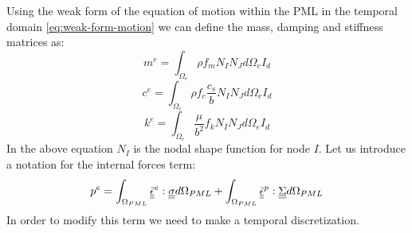 Using the weak form of the equation of motion within the PML in the temporal domain \ref{eq:weak-form-motion} we can define the mass, damping and stiffness matrices as:
\begin{equation}
m^{e} = \int_{\Omega_e} \rho f_m N_I N_J d\Omega_e I_d
\label{eq:2Dpml-elem-mass}
\end{equation}
\begin{equation}
 c^{e} = \int_{\Omega_e} \rho f_c \frac{c_s}{b} N_I N_J d\Omega_e I_d
 \label{eq:2Dpml-elem-damp}
\end{equation}
\begin{equation}
  k^{e} = \int_{\Omega_e} \frac{\mu}{b^2} f_k N_I N_J d\Omega_e I_d 
  \label{eq:2Dpml-elem-stiff}
\end{equation}
In the above equation $N_I$ is the nodal shape function for node $I$.
Let us introduce a notation for the internal forces term: 
\begin{equation}
p^e = \int_{\Omega_{PML}} \underline{\underline{\tilde{\epsilon}}}^e : \underline{\underline{\sigma}} d\Omega_{PML} + \int_{\Omega_{PML}} \underline{\underline{\tilde{\epsilon}}}^p : \underline{\underline{\Sigma}} d\Omega_{PML}
\end{equation}
In order to modify this term we need to make a temporal discretization.
